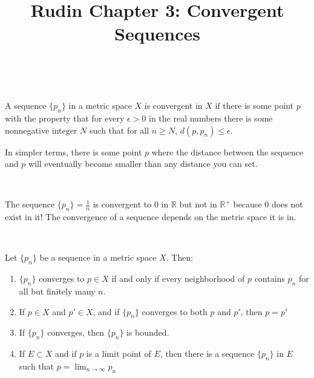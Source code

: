 \documentclass{article}
\title{Rudin Chapter 3: Convergent Sequences}
\begin{document}
\maketitle

\begin{definition}
\

A sequence $\{p_n\}$ in a metric space $X$ is convergent in $X$ if there is some point $p$ with the property that for every $\epsilon > 0$ in the real numbers there is some nonnegative integer $N$ such that for all $n \geq N$, $d(p, p_n) \leq \epsilon$.

In simpler terms, there is some point $p$ where the distance between the sequence and $p$ will eventually become smaller than any distance you can set. 
\end{definition}

\begin{example}
\

The sequence $\{p_n \} = \frac{1}{n}$ is convergent to $0$ in $\mathbb{R}$ but not in $\mathbb{R}^+$ because $0$ does not exist in it! The convergence of a sequence depends on the metric space it is in.
\end{example}

\begin{theorem}
\

Let $\{p_n\}$ be a sequence in a metric space $X$. Then:

\begin{enumerate}
    \item $\{p_n\}$ converges to $p \in X$ if and only if every neighborhood of $p$ contains $p_n$ for all but finitely many $n$.
    \item If $p \in X$ and $p' \in X$, and if $\{p_n\}$ converges to both $p$ and $p'$, then $p = p'$
    \item If $\{p_n\}$ converges, then $\{p_n\}$ is bounded. 
    \item If $E \subset X$ and if $p$ is a limit point of $E$, then there is a sequence $\{p_n\}$ in $E$ such that $p = \lim_{n \to \infty} p_n$
\end{enumerate}
\end{theorem}
\end{document}
